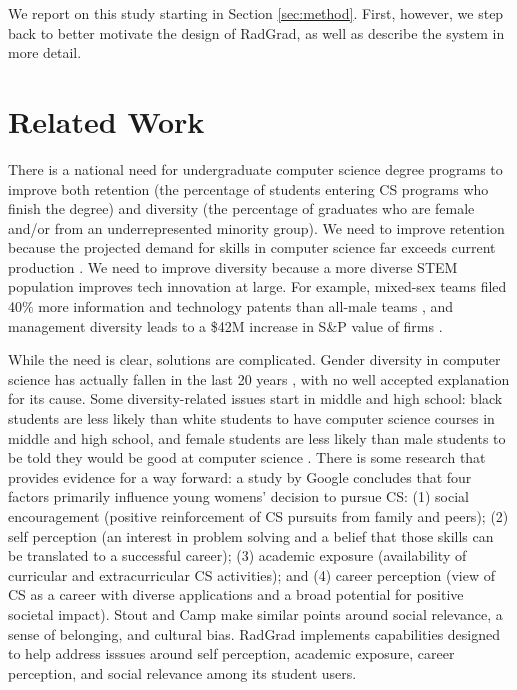 \documentclass[acmsmall]{acmart}
\begin{document}
We report on this study starting in Section \ref{sec:method}. First, however, we step back to better motivate the design of RadGrad, as well as describe the system in more detail.

\section{Related Work}
\label{sec:related-work}

There is a national need for undergraduate computer science degree programs to improve both retention (the percentage of students entering CS programs who finish the degree) and diversity (the percentage of graduates who are female and/or from an underrepresented minority group).  We need to improve retention because the projected demand for skills in computer science far exceeds current production \cite{camp_generation_2017}.  We need to improve diversity because a more diverse STEM population improves tech innovation at large. For example, mixed-sex teams filed 40\% more information and technology patents than all-male teams \cite{ashcraft_who_2012}, and management diversity leads to a \$42M increase in S\&P value of firms \cite{dezso_girl_2007}.

While the need is clear, solutions are complicated. Gender diversity in computer science has actually fallen in the last 20 years \cite{hong_women_2014}, with no well accepted explanation for its cause. Some diversity-related issues start in middle and high school: black students are less likely than white students to have computer science courses in middle and high school, and female students are less likely than male students to be told they would be good at computer science \cite{inc_diversity_2016}.   There is some research that provides evidence for a way forward: a study by Google \cite{hong_women_2014} concludes that four factors primarily influence young womens' decision to pursue CS: (1) social encouragement (positive reinforcement of CS pursuits from family and peers); (2) self perception (an interest in problem solving and a belief that those skills can be translated to a successful career); (3) academic exposure (availability of curricular and extracurricular CS activities); and (4) career perception (view of CS as a career with diverse applications and a broad potential for positive societal impact). Stout and Camp \cite{stout_now_2014} make similar points around social relevance, a sense of belonging, and cultural bias. RadGrad implements capabilities designed to help address isssues around self perception, academic exposure, career perception, and social relevance among its student users.
\end{document}

